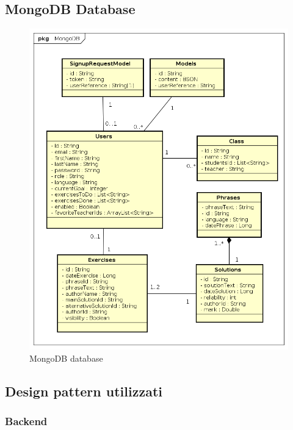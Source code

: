 \subsection{MongoDB Database}
\begin{figure}[H]
\centering
\includegraphics[width=17cm, keepaspectratio]{img/mongodb.png} 
\caption{MongoDB database}
\end{figure}
\newpage

\subsection{Design pattern utilizzati}
\subsubsection{Backend}
